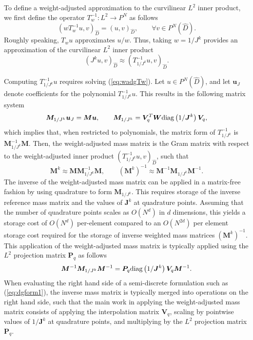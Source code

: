 \documentclass[10pt]{amsart}
\theoremstyle{definition}
\theoremstyle{lemma}
\theoremstyle{theorem}
\theoremstyle{assumption}
\renewcommand{\hat}{\widehat}
\newcommand{\LRp}[1]{\left( #1 \right)}
\newcommand{\diag}[1]{{\rm diag}\LRp{#1}}
\begin{document}
{To define a weight-adjusted approximation to the curvilinear $L^2$ inner product, we first define the operator $T_{w}^{-1}: L^2\rightarrow P^N$ as follows
\begin{equation}
  \LRp{wT_{w}^{-1} u,v}_{\hat{D}} = \LRp{ u,v}_{\hat{D}}, \qquad \forall v\in P^N\LRp{\hat{D}}.
\label{eq:wadgTw}
\end{equation}
Roughly speaking, $T_{w} u$ approximates $u/w$.  Thus, taking $w = 1/J^k$ provides an approximation of the curvilinear $L^2$ inner product
\begin{equation*}
\LRp{J^k u,v}_{\hat{D}} \approx \LRp{T_{1/J^k}^{-1} u,v}_{\hat{D}}.
\end{equation*}

Computing $T_{1/J^k}^{-1}u$ requires solving (\ref{eq:wadgTw}).  Let $u \in P^N\LRp{\hat{D}}$, and let $\bm{u}_J$ denote coefficients for the polynomial $T_{1/J^k}^{-1}u$.  This results in the following matrix system
\[
\bm{M}_{1/J^k}\bm{u}_{J} = \bm{M}\bm{u}, \qquad {\bm{M}_{1/J^k}} = \bm{V}_q^T \bm{W}\diag{1/\bm{J}^k}\bm{V}_q,%
\]
which implies that, when restricted to polynomials, the matrix form of $T_{1/J^k}^{-1}$ is $\bm{M}_{1/J^k}^{-1}\bm{M}$.  Then, the weight-adjusted mass matrix is the Gram matrix with respect to the weight-adjusted inner product $\LRp{T_{1/J^k}^{-1} u,v}_{\hat{D}}$, such that
\[
\bm{M}^k \approx \bm{M}\bm{M}_{1/J^k}^{-1}\bm{M}, \qquad \LRp{\bm{M}^k}^{-1} \approx \bm{M}^{-1}\bm{M}_{1/J^k}\bm{M}^{-1}.
\]
The inverse of the weight-adjusted mass matrix can be applied in a matrix-free fashion by using quadrature to form $\bm{M}_{1/J^k} $.  This requires storage of the inverse reference mass matrix and the values of $\bm{J}^k$ at quadrature points.  Assuming that the number of quadrature points scales as $O(N^d)$ in $d$ dimensions, this yields a storage cost of $O(N^d)$ per-element compared to an $O(N^{2d})$ per element storage cost required for the storage of inverse weighted mass matrices $\LRp{\bm{M}^k}^{-1}$.  This application of the weight-adjusted mass matrix is typically applied using the $L^2$ projection matrix $\bm{P}_q$ as follows
\[
\bm{M}^{-1}\bm{M}_{1/J^k}\bm{M}^{-1} = \bm{P}_q \diag{1/\bm{J}^k} \bm{V}_q \bm{M}^{-1}.
\]
When evaluating the right hand side of a semi-discrete formulation such as (\ref{eq:dgform1}), the inverse mass matrix is typically merged into operations on the right hand side, such that the main work in applying the weight-adjusted mass matrix consists of applying the interpolation matrix $\bm{V}_q$, scaling by pointwise values of $1/\bm{J}^k$ at quadrature points, and multiplying by the $L^2$ projection matrix $\bm{P}_q$.


}
\end{document}
